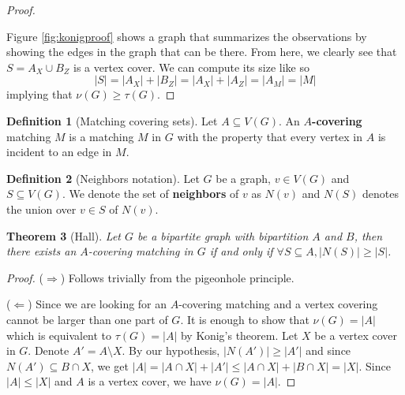 \documentclass{tufte-handout}
\newtheorem{thm}{Theorem}
\theoremstyle{definition}
\newtheorem{defn}[thm]{Definition}
\theoremstyle{remark}
\begin{document}
\begin{proof}
\begin{marginfigure}
\begin{center}
	\end{center}
\caption{Summary of the observations in Konig's theorem}
\label{fig:konigproof}
\end{marginfigure}
	Figure \ref{fig:konigproof} shows a graph that summarizes the observations by showing the edges in the graph that can be there. From here, we clearly see that $S = A_X \cup B_Z$ is a vertex cover. We can compute its size like so $$|S| = |A_X| + |B_Z| = |A_X| + |A_Z| = |A_M| = |M|$$
	implying that $\nu(G) \geq \tau(G)$.
\end{proof}
\begin{defn}[Matching covering sets]
	Let $A \subseteq V(G)$. An \textbf{$A$-covering} matching $M$ is a matching $M$ in $G$ with the property that every vertex in $A$ is incident to an edge in $M$.
\end{defn}
\begin{defn}[Neighbors notation]
	Let $G$ be a graph, $v \in V(G)$ and $S \subseteq V(G)$. We denote the set of \textbf{neighbors} of $v$ as $N(v)$ and $N(S)$ denotes the union over $v \in S$ of $N(v)$.
\end{defn}
\begin{thm}[Hall]
	Let $G$ be a bipartite graph with bipartition $A$ and $B$, then there exists an $A$-covering matching in $G$ if and only if $\forall S \subseteq A, |N(S)| \geq |S|$.
\end{thm}
\begin{proof}
	($\Rightarrow$) Follows trivially from the pigeonhole principle.
	
	($\Leftarrow$) Since we are looking for an $A$-covering matching and a vertex covering cannot be larger than one part of $G$. It is enough to show that $\nu(G) = |A|$ which is equivalent to $\tau(G)=|A|$ by Konig's theorem. Let $X$ be a vertex cover in $G$. Denote $A' =  A \setminus X$. By our hypothesis, $|N(A')| \geq |A'|$ and since $N(A') \subseteq B \cap X$, we get $|A|= |A \cap X| + |A'| \leq |A \cap X| + |B \cap X| = |X|$. Since $|A| \leq |X|$ and $A$ is a vertex cover, we have $\nu(G) = |A|$.
\end{proof}
\end{document}
